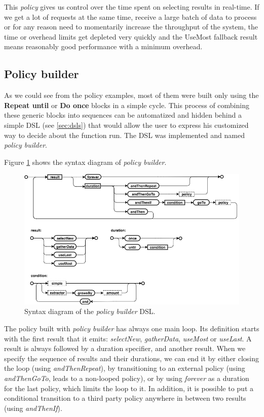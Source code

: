 This \textit{policy} gives us control over the time spent on selecting results in real-time. If we get a lot of requests at the same time, receive a large batch of data to process or for any reason need to momentarily increase the throughput of the system, the time or overhead limits get depleted very quickly and the UseMost fallback result means reasonably good performance with a minimum overhead.

\subsection{Policy builder}

As we could see from the policy examples, most of them were built only using the \textbf{Repeat until} or \textbf{Do once} blocks in a simple cycle. This process of combining these generic blocks into sequences can be automatized and hidden behind a simple DSL (see \ref{sec:dsls}) that would allow the user to express his customized way to decide about the function run. The DSL was implemented and named \textit{policy builder}.

Figure \ref{fig:policy_builder_chart} shows the syntax diagram of \textit{policy builder}.

\begin{figure}[h!]
	\captionsetup{justification=centering,margin=0.5cm}
	\centerline{\mbox{\includegraphics[width=130mm]{./img/policy_builder_chart.png}}}
	\caption{Syntax diagram of the \textit{policy builder} DSL.}
	\label{fig:policy_builder_chart}
\end{figure}

The policy built with \textit{policy builder} has always one main loop. Its definition starts with the first result that it emits: \textit{selectNew}, \textit{gatherData}, \textit{useMost} or \textit{useLast}. A result is always followed by a duration specifier, and another result. When we specify the sequence of results and their durations, we can end it by either closing the loop (using \textit{andThenRepeat}), by transitioning to an external policy (using \textit{andThenGoTo}, leads to a non-looped policy), or by using \textit{forever} as a duration for the last policy, which limits the loop to it. In addition, it is possible to put a conditional transition to a third party policy anywhere in between two results (using \textit{andThenIf}).

